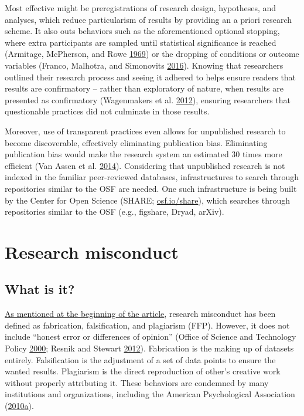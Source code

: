 \documentclass[a5paper]{book}
\begin{document}
Most effective might be preregistrations of research design, hypotheses,
and analyses, which reduce particularism of results by providing an a
priori research scheme. It also outs behaviors such as the
aforementioned optional stopping, where extra participants are sampled
until statistical significance is reached (Armitage, McPherson, and Rowe
\protect\hyperlink{ref-doi:10.2307ux2f2343787}{1969}) or the dropping of
conditions or outcome variables (Franco, Malhotra, and Simonovits
\protect\hyperlink{ref-doi:10.1177ux2f1948550615598377}{2016}). Knowing
that researchers outlined their research process and seeing it adhered
to helps ensure readers that results are confirmatory -- rather than
exploratory of nature, when results are presented as confirmatory
(Wagenmakers et al.
\protect\hyperlink{ref-doi:10.1177ux2f1745691612463078}{2012}), ensuring
researchers that questionable practices did not culminate in those
results.

Moreover, use of transparent practices even allows for unpublished
research to become discoverable, effectively eliminating publication
bias. Eliminating publication bias would make the research system an
estimated 30 times more efficient (Van Assen et al.
\protect\hyperlink{ref-doi:10.1371ux2fjournal.pone.0084896}{2014}).
Considering that unpublished research is not indexed in the familiar
peer-reviewed databases, infrastructures to search through repositories
similar to the OSF are needed. One such infrastructure is being built by
the Center for Open Science (SHARE;
\href{https://osf.io/share}{osf.io/share}), which searches through
repositories similar to the OSF (e.g., figshare, Dryad, arXiv).

\hypertarget{research-misconduct}{\section{Research
misconduct}\label{research-misconduct}}

\subsection{What is it?}\label{what-is-it-2}

\protect\hyperlink{introduction}{As mentioned at the beginning of the
article}, research misconduct has been defined as fabrication,
falsification, and plagiarism (FFP). However, it does not include
\enquote{honest error or differences of opinion} (Office of Science and
Technology Policy \protect\hyperlink{ref-ostp2000}{2000}; Resnik and
Stewart
\protect\hyperlink{ref-doi:10.1080ux2f08989621.2012.650948}{2012}).
Fabrication is the making up of datasets entirely. Falsification is the
adjustment of a set of data points to ensure the wanted results.
Plagiarism is the direct reproduction of other's creative work without
properly attributing it. These behaviors are condemned by many
institutions and organizations, including the American Psychological
Association
(\protect\hyperlink{ref-apa2010}{2010}\protect\hyperlink{ref-apa2010}{a}).
\end{document}
